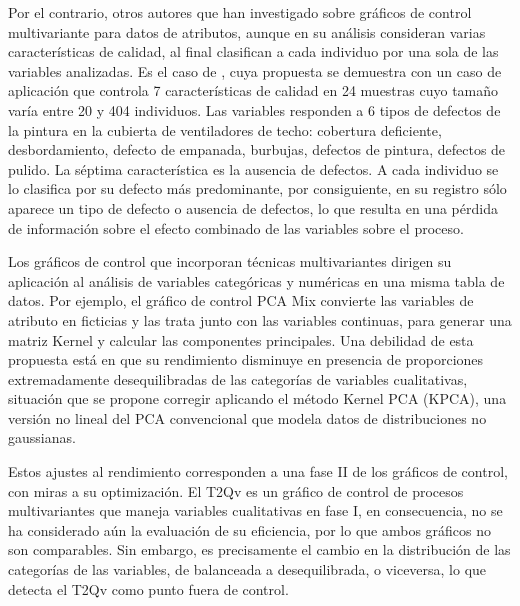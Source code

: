 \documentclass[mathematics,article,submit,moreauthors,pdftex]{mdpi}
\begin{document}
Por el contrario, otros autores que han investigado sobre gráficos de
control multivariante para datos de atributos, aunque en su análisis
consideran varias características de calidad, al final clasifican a cada
individuo por una sola de las variables analizadas. Es el caso de
\citet{ranjan2008multivariate}, cuya propuesta se demuestra con un caso
de aplicación que controla 7 características de calidad en 24 muestras
cuyo tamaño varía entre 20 y 404 individuos. Las variables responden a 6
tipos de defectos de la pintura en la cubierta de ventiladores de techo:
cobertura deficiente, desbordamiento, defecto de empanada, burbujas,
defectos de pintura, defectos de pulido. La séptima característica es la
ausencia de defectos. A cada individuo se lo clasifica por su defecto
más predominante, por consiguiente, en su registro sólo aparece un tipo
de defecto o ausencia de defectos, lo que resulta en una pérdida de
información sobre el efecto combinado de las variables sobre el proceso.

Los gráficos de control que incorporan técnicas multivariantes dirigen
su aplicación al análisis de variables categóricas y numéricas en una
misma tabla de datos. Por ejemplo, el gráfico de control PCA Mix
\citep{Ahsan2020} convierte las variables de atributo en ficticias y las
trata junto con las variables continuas, para generar una matriz Kernel
y calcular las componentes principales. Una debilidad de esta propuesta
está en que su rendimiento disminuye en presencia de proporciones
extremadamente desequilibradas de las categorías de variables
cualitativas, situación que se propone corregir aplicando el método
Kernel PCA (KPCA), una versión no lineal del PCA convencional que modela
datos de distribuciones no gaussianas.

Estos ajustes al rendimiento corresponden a una fase II de los gráficos
de control, con miras a su optimización. El T2Qv es un gráfico de
control de procesos multivariantes que maneja variables cualitativas en
fase I, en consecuencia, no se ha considerado aún la evaluación de su
eficiencia, por lo que ambos gráficos no son comparables. Sin embargo,
es precisamente el cambio en la distribución de las categorías de las
variables, de balanceada a desequilibrada, o viceversa, lo que detecta
el T2Qv como punto fuera de control.
\end{document}

